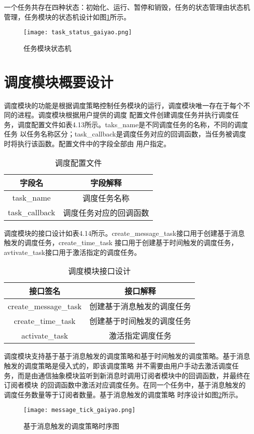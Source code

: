 一个任务共存在四种状态：初始化、运行、暂停和销毁，任务的状态管理由状态机管理，任务模块的状态机设计如图\ref{task_status_gaiyao}所示。
\begin{figure}[H]
  \centering
  \texttt{[image: task\_status\_gaiyao.png]}
  \caption{任务模块状态机}
  \label{task_status_gaiyao}
\end{figure}

\section{调度模块概要设计}
调度模块的功能是根据调度策略控制任务模块的运行，调度模块唯一存在于每个不同的进程。调度模块根据用户提供的调度
配置文件创建调度任务并执行调度任务，调度配置文件如表4.13所示。taks\_name是不同调度任务的名称，不同的调度任务
以任务名称区分；task\_callback是调度任务对应的回调函数，当任务被调度时将执行该函数。配置文件中的字段全部由
用户指定。
\begin{table}[H]
  \centering\small
  \caption{调度配置文件}
  \label{tab:exampletable}
  \begin{tabular}{cc}
    \toprule
    字段名 & 字段解释 \\
    \midrule
    task\_name & 调度任务名称\\
    task\_callback & 调度任务对应的回调函数\\
    \bottomrule
  \end{tabular}
\end{table}

调度模块的接口设计如表4.14所示。create\_message\_task接口用于创建基于消息触发的调度任务，create\_time\_task
接口用于创建基于时间触发的调度任务，avtivate\_task接口用于激活指定的调度任务。
\begin{table}[H]
  \centering\small
  \caption{调度模块接口设计}
  \label{tab:exampletable}
  \begin{tabular}{cc}
    \toprule
    接口签名 & 接口解释 \\
    \midrule
    create\_message\_task & 创建基于消息触发的调度任务 \\
    create\_time\_task & 创建基于时间触发的调度任务 \\
    activate\_task & 激活指定调度任务 \\
    \bottomrule
  \end{tabular}
\end{table}

调度模块支持基于基于消息触发的调度策略和基于时间触发的调度策略。基于消息触发的调度策略是侵入式的，即该调度策略
并不需要由用户手动去激活调度任务，而是由通信抽象模块监听到新消息时调用订阅者模块中的回调函数，并最终在订阅者模块
的回调函数中激活对应调度任务。在同一个任务中，基于消息触发的调度任务数量等于订阅者数量。基于消息触发的调度策略
时序设计如图\ref{message_tick_gaiyao}所示。
\begin{figure}[H]
  \centering
  \texttt{[image: message\_tick\_gaiyao.png]}
  \caption{基于消息触发的调度策略时序图}
  \label{message_tick_gaiyao}
\end{figure}

